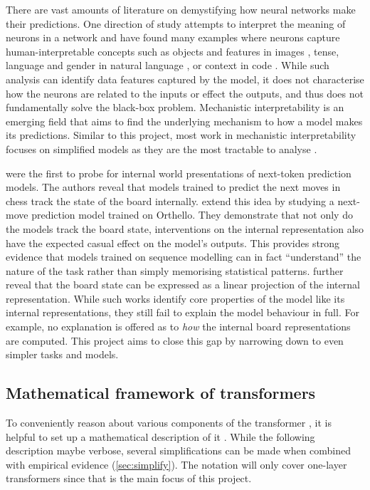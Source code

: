 \documentclass{article}
\begin{document}
There are vast amounts of literature on demystifying how neural networks make their predictions. One direction of study attempts to interpret the meaning of neurons in a network and have found many examples where neurons capture human-interpretable concepts such as objects and features in images \cite{bau2020understanding,cammarata2020thread:,zhou2014object}, tense, language and gender in natural language \cite{bau2018identifying,gurnee2023finding}, or context in code \cite{karpathy2015visualizing}. While such analysis can identify data features captured by the model, it does not characterise how the neurons are related to the inputs or effect the outputs, and thus does not fundamentally solve the black-box problem. Mechanistic interpretability is an emerging field that aims to find the underlying mechanism to how a model makes its predictions. Similar to this project, most work in mechanistic interpretability focuses on simplified models as they are the most tractable to analyse \cite{elhage2022toy,elhage2021mathematical,olsson2022context,nanda2023progress}.

\citet{toshniwal2021learning} were the first to probe for internal world presentations of next-token prediction models. The authors reveal that models trained to predict the next moves in chess track the state of the board internally. \citet{orthello-gpt} extend this idea by studying a next-move prediction model trained on Orthello. They demonstrate that not only do the models track the board state, interventions on the internal representation also have the expected casual effect on the model's outputs. This provides strong evidence that models trained on sequence modelling can in fact ``understand'' the nature of the task rather than simply memorising statistical patterns. \citet{linear-orthello-gpt} further reveal that the board state can be expressed as a linear projection of the internal representation. While such works identify core properties of the model like its internal representations, they still fail to explain the model behaviour in full. For example, no explanation is offered as to \emph{how} the internal board representations are computed. This project aims to close this gap by narrowing down to even simpler tasks and models.

\subsection{Mathematical framework of transformers} \label{sec:math}

To conveniently reason about various components of the transformer \citep{vaswani2017attention}, it is helpful to set up a mathematical description of it \citep{elhage2021mathematical}. While the following description maybe verbose, several simplifications can be made when combined with empirical evidence (\cref{sec:simplify}). The notation will only cover one-layer transformers since that is the main focus of this project.
\end{document}
